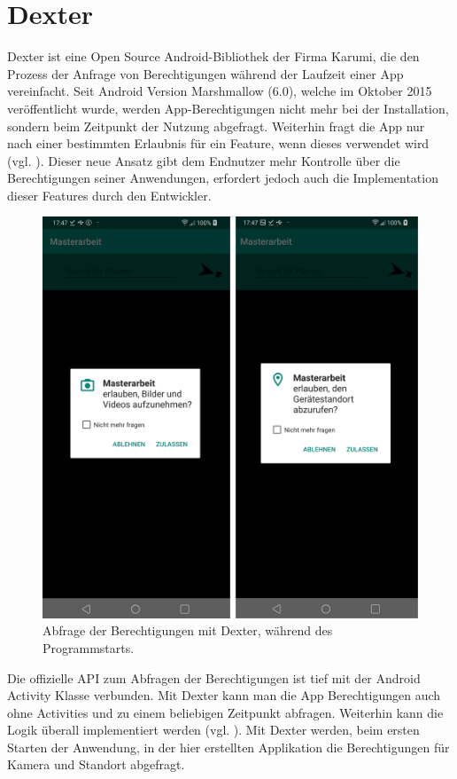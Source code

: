 \section{Dexter}

Dexter ist eine Open Source Android-Bibliothek der Firma Karumi, die den Prozess der Anfrage von Berechtigungen während der Laufzeit einer App vereinfacht. Seit Android Version Marshmallow (6.0), welche im Oktober 2015 veröffentlicht wurde, werden App-Berechtigungen nicht mehr bei der Installation, sondern beim Zeitpunkt der Nutzung abgefragt. Weiterhin fragt die App nur nach einer bestimmten Erlaubnis für ein Feature, wenn dieses verwendet wird (vgl. \cite{marshmallow}). Dieser neue Ansatz gibt dem Endnutzer mehr Kontrolle über die Berechtigungen seiner Anwendungen, erfordert jedoch auch die Implementation dieser Features durch den Entwickler. 

\begin{figure}[H]
	\centering
	\includegraphics[scale=0.14]{request.png}
	\caption{Abfrage der Berechtigungen mit Dexter, während des Programmstarts.}
\end{figure} 

Die offizielle API zum Abfragen der Berechtigungen ist tief mit der Android \glqq Activity\grqq{} Klasse verbunden. Mit Dexter kann man die App Berechtigungen auch ohne Activities und zu einem beliebigen Zeitpunkt abfragen. Weiterhin kann die Logik überall implementiert werden (vgl. \cite{dexter}). Mit Dexter werden, beim ersten Starten der Anwendung, in der hier erstellten Applikation die Berechtigungen für Kamera und Standort abgefragt.

